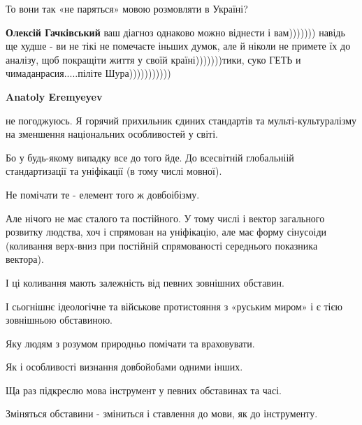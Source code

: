 \begin{itemize}
\begin{itemize}
\begin{itemize}
То вони так «не паряться» мовою розмовляти в Україні?

 
\textbf{Олексій Гачківський} ваш діагноз однаково можно віднести і вам))))))) навідь ще худше - ви не тікі не помечаєте іньших думок, але й ніколи не примете їх до аналізу, щоб покращіти життя у своїй країні)))))))тики, суко ГЕТЬ и чимаданрасия.....піліте Шура)))))))))))

 
\textbf{Anatoly Eremyeyev} 

не погоджуюсь. Я горячий прихильник єдиних стандартів та мульті-культуралізму
на зменшення національних особливостей у світі.

Бо у будь-якому випадку все до того йде. До всесвітній глобальніій
стандартизації та уніфікації (в тому числі мовної).

Не помічати те - елемент того ж довбоібізму.

Але нічого не має сталого та постійного. У тому числі і вектор загального
розвитку людства, хоч і спрямован на уніфікацію, але має форму сінусоіди
(коливання верх-вниз при постійній спрямованості середнього показника вектора).

І ці коливання мають залежність від певних зовнішних обставин.

І сьогнішнє ідеологічне та військове протистояння з «руським миром» і є тією
зовнішньою обставиною.

Яку людям з розумом природньо помічати та враховувати.

Як і особливості визнання довбойобами одними інших.

Ща раз підкреслю мова інструмент у певних обставинах та часі.

Зміняться обставини - зміниться і ставлення до мови, як до інструменту.

 

\end{itemize}
\end{itemize}
\end{itemize}
